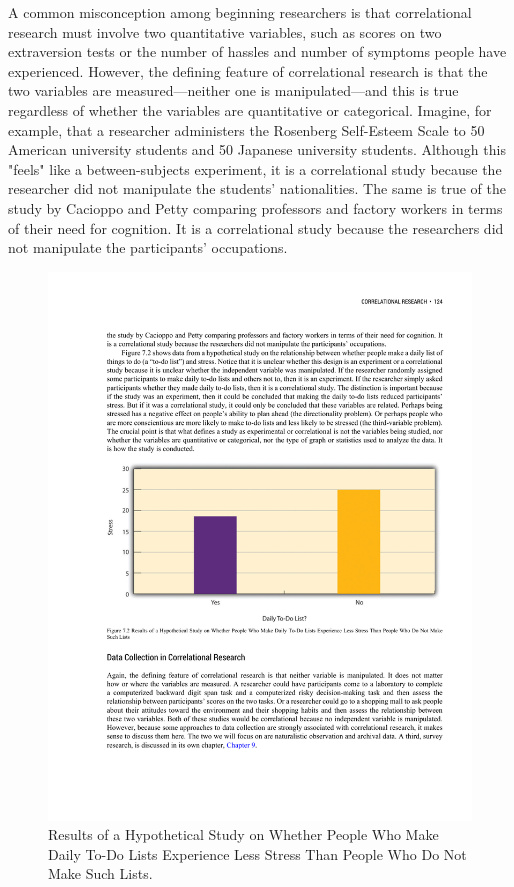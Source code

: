 A common misconception among beginning researchers is that correlational research must involve two quantitative variables, such as scores on two extraversion tests or the number of hassles and number of symptoms people have experienced. However, the defining feature of correlational research is that the two variables are measured---neither one is manipulated---and this is true regardless of whether the variables are quantitative or categorical. Imagine, for example, that a researcher administers the Rosenberg Self-Esteem Scale to 50 American university students and 50 Japanese university students. Although this "feels" like a between-subjects experiment, it is a correlational study because the researcher did not manipulate the students' nationalities. The same is true of
the study by Cacioppo and Petty comparing professors and factory workers in terms of their need for cognition. It is a correlational study because the researchers did not manipulate the participants' occupations.

\begin{figure}
\includegraphics[width=\linewidth]{figures/C7daily.pdf}
\caption{Results of a Hypothetical Study on Whether People Who Make Daily To-Do Lists Experience Less Stress Than People Who Do Not Make Such Lists.
}
\label{fig:daily}
\end{figure}

